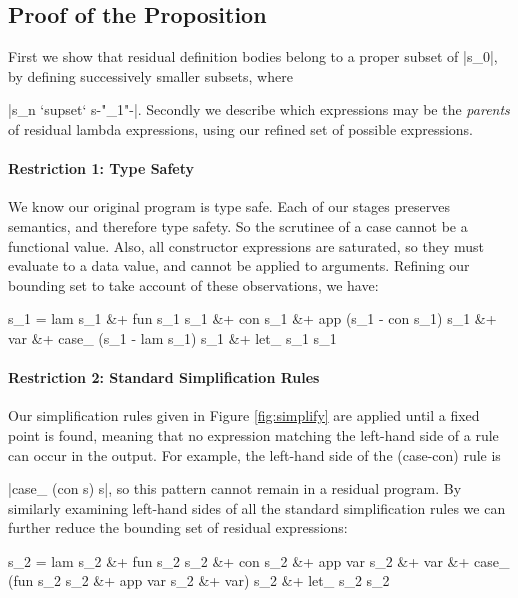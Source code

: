\documentclass[preprint]{sigplanconf}
\begin{document}
\subsection{Proof of the Proposition}


First we show that residual definition bodies belong to a proper subset of |s_0|, by defining successively smaller subsets, where \ignore|s_n `supset` s{-"_{\text{\tiny{+}}1}"-}|. Secondly we describe which expressions may be the \textit{parents} of residual lambda expressions, using our refined set of possible expressions.

\paragraph{Restriction 1: Type Safety}
We know our original program is type safe. Each of our stages preserves semantics, and therefore type safety. So the scrutinee of a case cannot be a functional value. Also, all constructor expressions are saturated, so they must evaluate to a data value, and cannot be applied to arguments. Refining our bounding set to take account of these observations, we have:

\ignore\begin{code}
s_1  =  lam s_1 &+ fun s_1 s_1 &+ con s_1 &+ app (s_1 - con s_1) s_1 &+ var &+
        case_ (s_1 - lam s_1) s_1 &+ let_ s_1 s_1
\end{code}

\paragraph{Restriction 2: Standard Simplification Rules}
Our simplification rules given in Figure \ref{fig:simplify} are applied until a fixed point is found, meaning that no expression matching the left-hand side of a rule can occur in the output. For example, the left-hand side of the (case-con) rule is \ignore|case_ (con s) s|, so this pattern cannot remain in a residual program. By similarly examining left-hand sides of all the standard simplification rules we can further reduce the bounding set of residual expressions:

\ignore\begin{code}
s_2  =  lam s_2 &+ fun s_2 s_2 &+ con s_2 &+ app var s_2 &+ var &+
        case_ (fun s_2 s_2 &+ app var s_2 &+ var) s_2 &+ let_ s_2 s_2
\end{code}
\end{document}
